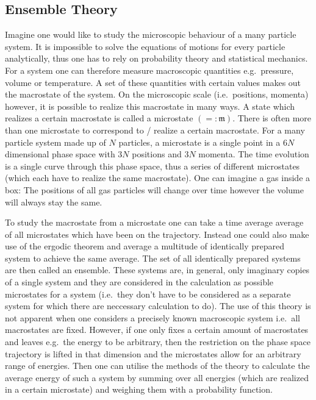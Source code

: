 \documentclass[a4paper,10pt]{article}
\numberwithin{equation}{section}
\begin{document}
\begin{multicols}{2}


\section{Ensemble Theory}
Imagine one would like to study the microscopic behaviour of a many particle system.
It is impossible to solve the equations of motions for every particle analytically, thus one has to rely on probability theory and statistical mechanics.
For a system one can therefore measure macroscopic quantities e.g.\ pressure, volume or temperature.
A set of these quantities with certain values makes out the macrostate of the system.
On the microscopic scale (i.e.\ positions, momenta) however, it is possible to realize this macrostate in many ways.
A state which realizes a certain macrostate is called a microstate $\left(=:\mathfrak{m}\right)$.
There is often more than one microstate to correspond to / realize a certain macrostate.
For a many particle system made up of $N$ particles, a microstate is a single point in a $6N$ dimensional phase space with $3N$ positions and $3N$ momenta.
The time evolution is a single curve through this phase space, thus a series of different microstates (which each have to realize the same macrostate).
One can imagine a gas inside a box: The positions of all gas particles will change over time however the volume will always stay the same.

To study the macrostate from a microstate one can take a time average average of all microstates which have been on the trajectory.
Instead one could also make use of the ergodic theorem and average a multitude of identically prepared system to achieve the same average.
The set of all identically prepared systems are then called an ensemble.
These systems are, in general, only imaginary copies of a single system and they are considered in the calculation as possible microstates for a system (i.e.\ they don't have to be considered as a separate system for which there are neccessary calculation to do).
The use of this theory is not apparent when one considers a precisely known macroscopic system i.e.\ all macrostates are fixed.
However, if one only fixes a certain amount of macrostates and leaves e.g.\ the energy to be arbitrary, then the restriction on the phase space trajectory is lifted in that dimension and the microstates allow for an arbitrary range of energies.
Then one can utilise the methods of the theory to calculate the average energy of such a system by summing over all energies (which are realized in a certain microstate) and weighing them with a probability function.


\end{multicols}
\end{document}
